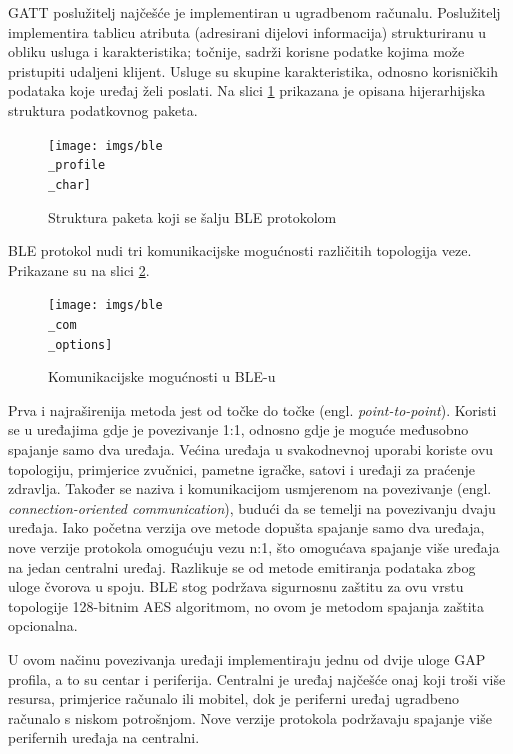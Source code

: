 GATT poslužitelj najčešće je implementiran u ugradbenom računalu. Poslužitelj implementira tablicu atributa (adresirani dijelovi informacija) strukturiranu u obliku usluga i karakteristika; točnije, sadrži korisne podatke kojima može pristupiti udaljeni klijent. Usluge su skupine karakteristika, odnosno korisničkih podataka koje uređaj želi poslati. Na slici \ref{fig:ble_profile_char} prikazana je opisana hijerarhijska struktura podatkovnog paketa. 

\begin{figure}[ht]
	\centering
	\texttt{[image: imgs/ble\\\_profile\\\_char]}
	\caption{Struktura paketa koji se šalju BLE protokolom \cite{ble_profile_char}}
	\label{fig:ble_profile_char}
\end{figure}


BLE protokol nudi tri komunikacijske mogućnosti različitih topologija veze. Prikazane su na slici \ref{fig:ble_com_options}. 

\begin{figure}[ht]
	\centering
	\texttt{[image: imgs/ble\\\_com\\\_options]}
	\caption{Komunikacijske mogućnosti u BLE-u \cite{ble_profiles}}
	\label{fig:ble_com_options}
\end{figure}

Prva i najraširenija metoda jest od točke do točke (engl. \textit{point-to-point}). Koristi se u uređajima gdje je povezivanje 1:1, odnosno gdje je moguće međusobno spajanje samo dva uređaja. Većina uređaja u svakodnevnoj uporabi koriste ovu topologiju, primjerice zvučnici, pametne igračke, satovi i uređaji za praćenje zdravlja. Također se naziva i komunikacijom usmjerenom na povezivanje (engl. \textit{connection-oriented communication}), budući da se temelji na povezivanju dvaju uređaja. Iako početna verzija ove metode dopušta spajanje samo dva uređaja, nove verzije protokola omogućuju vezu n:1, što omogućava spajanje više uređaja na jedan centralni uređaj. Razlikuje se od metode emitiranja podataka zbog uloge čvorova u spoju. BLE stog podržava sigurnosnu zaštitu za ovu vrstu topologije 128-bitnim AES algoritmom, no ovom je metodom spajanja zaštita opcionalna. 

U ovom načinu povezivanja uređaji implementiraju jednu od dvije uloge GAP profila, a to su centar i periferija. Centralni je uređaj najčešće onaj koji troši više resursa, primjerice računalo ili mobitel, dok je periferni uređaj ugradbeno računalo s niskom potrošnjom. Nove verzije protokola podržavaju spajanje više perifernih uređaja na centralni.


